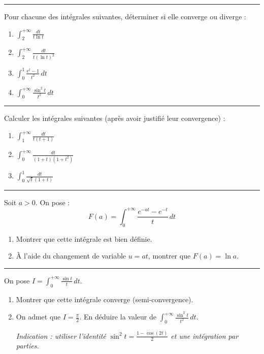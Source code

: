 \documentclass[../PolyS4.tex]{subfiles}
\begin{document}
\vspace{1em}
\hrule
\vspace{1em}


Pour chacune des intégrales suivantes, déterminer si elle converge ou diverge :

\begin{enumerate}
\item $\displaystyle\int_{2}^{+\infty} \frac{dt}{t \ln t}$
\item $\displaystyle\int_{2}^{+\infty} \frac{dt}{t (\ln t)^2}$
\item $\displaystyle\int_{0}^{1} \frac{e^t - 1}{t^2} \, dt$
\item $\displaystyle\int_{0}^{+\infty} \frac{\sin^2 t}{t^2} \, dt$
\end{enumerate}

\vspace{1em}
\hrule
\vspace{1em}


Calculer les intégrales suivantes (après avoir justifié leur convergence) :

\begin{enumerate}
\item $\displaystyle\int_{1}^{+\infty} \frac{dt}{t(t+1)}$
\item $\displaystyle\int_{0}^{+\infty} \frac{dt}{(1+t)(1+t^2)}$
\item $\displaystyle\int_{0}^{1} \frac{dt}{\sqrt{t}(1+t)}$
\end{enumerate}

\vspace{1em}
\hrule
\vspace{1em}


Soit $a > 0$. On pose :
$$F(a) = \int_{0}^{+\infty} \frac{e^{-at} - e^{-t}}{t} \, dt$$

\begin{enumerate}
\item Montrer que cette intégrale est bien définie.
\item À l'aide du changement de variable $u = at$, montrer que $F(a) = \ln a$.
\end{enumerate}

\vspace{1em}
\hrule
\vspace{1em}


On pose $I = \displaystyle\int_{0}^{+\infty} \frac{\sin t}{t} \, dt$.

\begin{enumerate}
\item Montrer que cette intégrale converge (semi-convergence).
\item On admet que $I = \frac{\pi}{2}$. En déduire la valeur de $\displaystyle\int_{0}^{+\infty} \frac{\sin^2 t}{t^2} \, dt$.

\textit{Indication : utiliser l'identité $\sin^2 t = \frac{1 - \cos(2t)}{2}$ et une intégration par parties.}
\end{enumerate}
\end{document}
